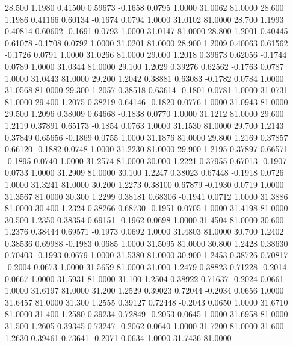   28.500   1.1980   0.41500   0.59673  -0.1658   0.0795   1.0000  31.0062  81.0000
  28.600   1.1986   0.41166   0.60134  -0.1674   0.0794   1.0000  31.0102  81.0000
  28.700   1.1993   0.40814   0.60602  -0.1691   0.0793   1.0000  31.0147  81.0000
  28.800   1.2001   0.40445   0.61078  -0.1708   0.0792   1.0000  31.0201  81.0000
  28.900   1.2009   0.40063   0.61562  -0.1726   0.0791   1.0000  31.0266  81.0000
  29.000   1.2018   0.39673   0.62056  -0.1744   0.0789   1.0000  31.0344  81.0000
  29.100   1.2029   0.39276   0.62562  -0.1763   0.0787   1.0000  31.0443  81.0000
  29.200   1.2042   0.38881   0.63083  -0.1782   0.0784   1.0000  31.0568  81.0000
  29.300   1.2057   0.38518   0.63614  -0.1801   0.0781   1.0000  31.0731  81.0000
  29.400   1.2075   0.38219   0.64146  -0.1820   0.0776   1.0000  31.0943  81.0000
  29.500   1.2096   0.38009   0.64668  -0.1838   0.0770   1.0000  31.1212  81.0000
  29.600   1.2119   0.37891   0.65173  -0.1854   0.0763   1.0000  31.1530  81.0000
  29.700   1.2143   0.37849   0.65656  -0.1869   0.0755   1.0000  31.1876  81.0000
  29.800   1.2169   0.37857   0.66120  -0.1882   0.0748   1.0000  31.2230  81.0000
  29.900   1.2195   0.37897   0.66571  -0.1895   0.0740   1.0000  31.2574  81.0000
  30.000   1.2221   0.37955   0.67013  -0.1907   0.0733   1.0000  31.2909  81.0000
  30.100   1.2247   0.38023   0.67448  -0.1918   0.0726   1.0000  31.3241  81.0000
  30.200   1.2273   0.38100   0.67879  -0.1930   0.0719   1.0000  31.3567  81.0000
  30.300   1.2299   0.38181   0.68306  -0.1941   0.0712   1.0000  31.3886  81.0000
  30.400   1.2324   0.38266   0.68730  -0.1951   0.0705   1.0000  31.4198  81.0000
  30.500   1.2350   0.38354   0.69151  -0.1962   0.0698   1.0000  31.4504  81.0000
  30.600   1.2376   0.38444   0.69571  -0.1973   0.0692   1.0000  31.4803  81.0000
  30.700   1.2402   0.38536   0.69988  -0.1983   0.0685   1.0000  31.5095  81.0000
  30.800   1.2428   0.38630   0.70403  -0.1993   0.0679   1.0000  31.5380  81.0000
  30.900   1.2453   0.38726   0.70817  -0.2004   0.0673   1.0000  31.5659  81.0000
  31.000   1.2479   0.38823   0.71228  -0.2014   0.0667   1.0000  31.5931  81.0000
  31.100   1.2504   0.38922   0.71637  -0.2024   0.0661   1.0000  31.6197  81.0000
  31.200   1.2529   0.39023   0.72044  -0.2034   0.0656   1.0000  31.6457  81.0000
  31.300   1.2555   0.39127   0.72448  -0.2043   0.0650   1.0000  31.6710  81.0000
  31.400   1.2580   0.39234   0.72849  -0.2053   0.0645   1.0000  31.6958  81.0000
  31.500   1.2605   0.39345   0.73247  -0.2062   0.0640   1.0000  31.7200  81.0000
  31.600   1.2630   0.39461   0.73641  -0.2071   0.0634   1.0000  31.7436  81.0000
